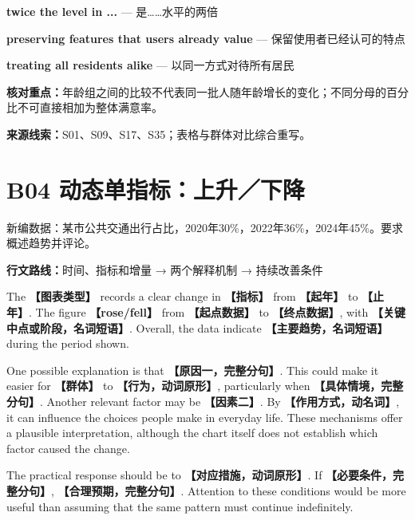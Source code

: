 \documentclass[11pt,a4paper,fontset=macnew]{ctexart}
\newenvironment{writing}{\begingroup\fontsize{10.5}{13.5}\selectfont\setlength{\parskip}{3pt}}{\par\endgroup}
\begin{document}
\par\vspace{4pt}{\bfseries 好词好句：优先记这三处}\par\nopagebreak
{\small\textbf{twice the level in ...} — 是……水平的两倍}\par
{\small\textbf{preserving features that users already value} — 保留使用者已经认可的特点}\par
{\small\textbf{treating all residents alike} — 以同一方式对待所有居民}\par
{\small\textbf{核对重点：}年龄组之间的比较不代表同一批人随年龄增长的变化；不同分母的百分比不可直接相加为整体满意率。}\par
{\fontsize{8}{10}\selectfont\textbf{来源线索：}S01、S09、S17、S35；表格与群体对比综合重写。}\par
\clearpage\section*{B04  动态单指标：上升／下降}
{\small 新编数据：某市公共交通出行占比，2020年30\%，2022年36\%，2024年45\%。要求概述趋势并评论。}\par
{\small\textbf{行文路线：}时间、指标和增量 → 两个解释机制 → 持续改善条件}\par
\par\vspace{4pt}{\bfseries 可替换模板}\par\nopagebreak
\begin{writing}
The {\bfseries 【图表类型】} records a clear change in {\bfseries 【指标】} from {\bfseries 【起年】} to {\bfseries 【止年】}. The figure {\bfseries 【rose/fell】} from {\bfseries 【起点数据】} to {\bfseries 【终点数据】}, with {\bfseries 【关键中点或阶段，名词短语】}. Overall, the data indicate {\bfseries 【主要趋势，名词短语】} during the period shown.

One possible explanation is that {\bfseries 【原因一，完整分句】}. This could make it easier for {\bfseries 【群体】} to {\bfseries 【行为，动词原形】}, particularly when {\bfseries 【具体情境，完整分句】}. Another relevant factor may be {\bfseries 【因素二】}. By {\bfseries 【作用方式，动名词】}, it can influence the choices people make in everyday life. These mechanisms offer a plausible interpretation, although the chart itself does not establish which factor caused the change.

The practical response should be to {\bfseries 【对应措施，动词原形】}. If {\bfseries 【必要条件，完整分句】}, {\bfseries 【合理预期，完整分句】}. Attention to these conditions would be more useful than assuming that the same pattern must continue indefinitely.

\end{writing}
\end{document}
